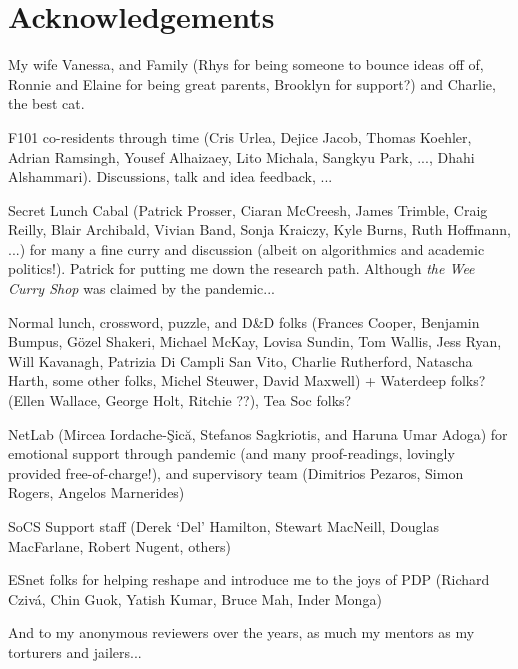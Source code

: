 \chapter*{Acknowledgements}

My wife Vanessa, and Family (Rhys for being someone to bounce ideas off of, Ronnie and Elaine for being great parents, Brooklyn for support?) and Charlie, the best cat.

F101 co-residents through time (Cris Urlea, Dejice Jacob, Thomas Koehler, Adrian Ramsingh, Yousef Alhaizaey, Lito Michala, Sangkyu Park, ..., Dhahi Alshammari). Discussions, talk and idea feedback, ...

Secret Lunch Cabal (Patrick Prosser, Ciaran McCreesh, James Trimble, Craig Reilly, Blair Archibald, Vivian Band, Sonja Kraiczy, Kyle Burns, Ruth Hoffmann, ...) for many a fine curry and discussion (albeit on algorithmics and academic politics!). Patrick for putting me down the research path. Although \emph{the Wee Curry Shop} was claimed by the pandemic...

Normal lunch, crossword, puzzle, and D\&D folks (Frances Cooper, Benjamin Bumpus, G\"{o}zel Shakeri, Michael McKay, Lovisa Sundin, Tom Wallis, Jess Ryan, Will Kavanagh, Patrizia Di Campli San Vito, Charlie Rutherford, Natascha Harth, some other folks, Michel Steuwer, David Maxwell) + Waterdeep folks? (Ellen Wallace, George Holt, Ritchie ??), Tea Soc folks?

NetLab (Mircea Iordache-\c{S}ic\u{a}, Stefanos Sagkriotis, and Haruna Umar Adoga) for emotional support through pandemic (and many proof-readings, lovingly provided free-of-charge!), and supervisory team (Dimitrios Pezaros, Simon Rogers, Angelos Marnerides)

SoCS Support staff (Derek `Del' Hamilton, Stewart MacNeill, Douglas MacFarlane, Robert Nugent, others)

ESnet folks for helping reshape and introduce me to the joys of PDP (Richard Cziv\'{a}, Chin Guok, Yatish Kumar, Bruce Mah, Inder Monga)

And to my anonymous reviewers over the years, as much my mentors as my torturers and jailers...